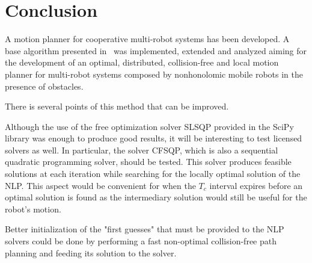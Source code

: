 \documentclass[12pt]{book}
\numberwithin{equation}{section}
\begin{document}

\setcounter{page}{1}
\mainmatter
\tableofcontents






\chapter{Conclusion}

A motion planner for cooperative multi-robot systems has been developed. A base algorithm presented in~\cite{Defoort2009} was implemented, extended and analyzed aiming for the development of an optimal, distributed, collision-free and local motion planner for multi-robot systems composed by nonhonolomic mobile robots in  the presence of obstacles.

There is several points of this method that can be improved.

Although the use of the free optimization solver SLSQP provided in the SciPy library was enough to produce good results, it will be interesting to test licensed solvers as well. In particular, the solver CFSQP, which is also a sequential quadratic programming solver, should be tested. This solver produces feasible solutions at each iteration while searching for the locally optimal solution of the NLP. This aspect would be convenient for when the $T_c$ interval expires before an optimal solution is found as the intermediary solution would still be useful for the robot's motion.

Better initialization of the "first guesses" that must be provided to the NLP solvers could be done by performing a fast non-optimal collision-free path planning and feeding its solution to the solver.

\nocite{*}




\appendix
\lipsum[1-5]
\end{document}
